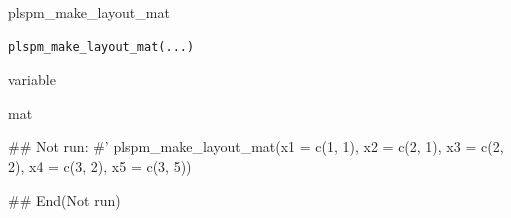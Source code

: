 \documentclass[a4paper]{book}
\begin{document}
%
\begin{Description}
plspm\_make\_layout\_mat
\end{Description}
%
\begin{Usage}
\begin{verbatim}
plspm_make_layout_mat(...)
\end{verbatim}
\end{Usage}
%
\begin{Arguments}
\begin{ldescription}
\item[\code{...}] variable
\end{ldescription}
\end{Arguments}
%
\begin{Value}
mat
\end{Value}
%
\begin{Examples}
\begin{ExampleCode}

\#\# Not run: 
#'
plspm_make_layout_mat(x1 = c(1, 1),
                      x2 = c(2, 1),
                      x3 = c(2, 2),
                      x4 = c(3, 2),
                      x5 = c(3, 5))

## End(Not run)


\end{ExampleCode}
\end{Examples}
\end{document}
